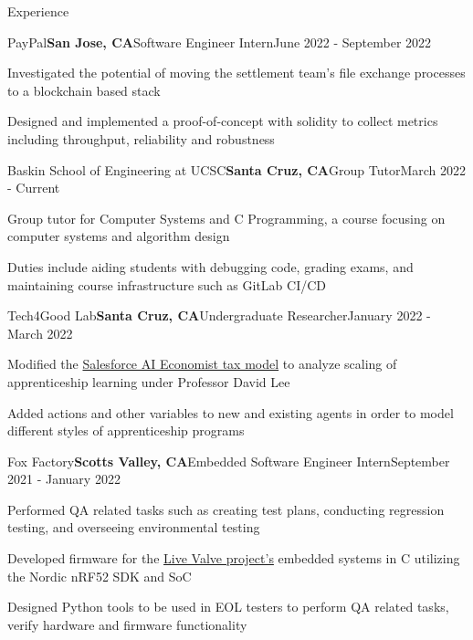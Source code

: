 \documentclass{resume}
\begin{document}
\begin{rSection}{\large Experience}

\begin{rSubsection}{PayPal}{\bf{San Jose, CA}}{Software Engineer Intern}{June 2022 - September 2022}
\item Investigated the potential of moving the settlement team's file exchange processes to a blockchain based stack
\item Designed and implemented a proof-of-concept with solidity to collect metrics including throughput, reliability and robustness
\end{rSubsection}

\begin{rSubsection}{Baskin School of Engineering at UCSC}{\bf{Santa Cruz, CA}}{Group Tutor}{March 2022 - Current}
\item Group tutor for Computer Systems and C Programming, a course focusing on computer systems and algorithm design
\item Duties include aiding students with debugging code, grading exams, and maintaining course infrastructure such as GitLab CI/CD
\end{rSubsection}

\begin{rSubsection}{Tech4Good Lab}{\bf{Santa Cruz, CA}}{Undergraduate Researcher}{January 2022 - March 2022}
\item Modified the \href{https://github.com/salesforce/ai-economist}{Salesforce AI Economist tax model} to analyze scaling of apprenticeship learning under Professor David Lee
\item Added actions and other variables to new and existing agents in order to model different styles of apprenticeship programs
\end{rSubsection}

\begin{rSubsection}{Fox Factory}{\bf{Scotts Valley, CA}}{Embedded Software Engineer Intern}{September 2021 - January 2022}
\item Performed QA related tasks such as creating test plans, conducting regression testing, and overseeing environmental testing
\item Developed firmware for the \href{https://www.pinkbike.com/news/fox-updates-live-valve-electonic-suspension-for-2022.html}{Live Valve project's} embedded systems in C utilizing the Nordic nRF52 SDK and SoC
\item Designed Python tools to be used in EOL testers to perform QA related tasks, verify hardware and firmware functionality
\end{rSubsection}
\end{rSection}
\end{document}
